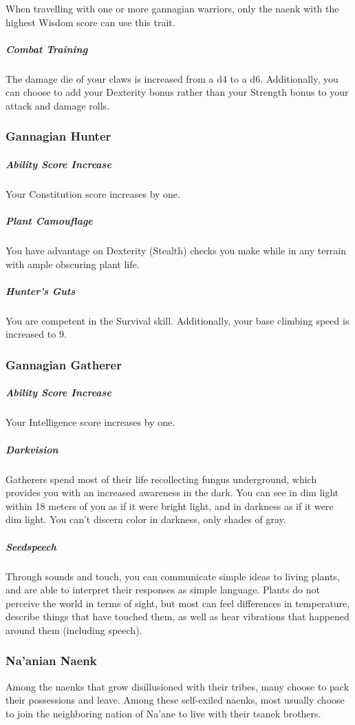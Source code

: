 \begin{linenumbers}
When travelling with one or more gannagian warriors, only the naenk with the highest Wisdom score can use this trait.

\subparagraph{Combat Training} The damage die of your claws is increased from a d4 to a d6.
Additionally, you can choose to add your Dexterity bonus rather than your Strength bonus to your attack and damage rolls.

\subsubsection{Gannagian Hunter}
\subparagraph{Ability Score Increase} Your Constitution score increases by one.

\subparagraph{Plant Camouflage} You have advantage on Dexterity (Stealth) checks you make while in any terrain with ample obscuring plant life.

\subparagraph{Hunter's Guts} You are competent in the Survival skill.
Additionally, your base climbing speed is increased to 9.

\subsubsection{Gannagian Gatherer}
\subparagraph{Ability Score Increase} Your Intelligence score increases by one.

\subparagraph{Darkvision} Gatherers spend most of their life recollecting fungus underground, which provides you with an increased awareness in the dark.
You can see in dim light within 18 meters of you as if it were bright light, and in darkness as if it were dim light.
You can't discern color in darkness, only shades of gray.

\subparagraph{Seedspeech} Through sounds and touch, you can communicate simple ideas to living plants, and are able to interpret their responses as simple language.
Plants do not perceive the world in terms of sight, but most can feel differences in temperature, describe things that have touched them, as well as hear vibrations that happened around them (including speech).

\subsubsection{Na'anian Naenk}
Among the naenks that grow disillusioned with their tribes, many choose to pack their possessions and leave.
Among these self-exiled naenks, most usually choose to join the neighboring nation of Na'ane to live with their tsanek brothers.


\end{linenumbers}

